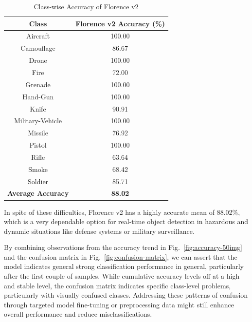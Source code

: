 \documentclass[fleqn,10pt,lineno]{wlpeerj}
\begin{document}
\begin{table}[H]
\centering
\caption{Class-wise Accuracy of Florence v2 }
\renewcommand{\arraystretch}{1.5} %
\setlength{\tabcolsep}{12pt} %
\begin{tabular}{|c|c|}
\hline
\textbf{Class} & \textbf{Florence v2 Accuracy (\%)} \\
\hline
Aircraft           & 100.00 \\
Camouflage         & 86.67  \\
Drone              & 100.00 \\
Fire               & 72.00  \\
Grenade            & 100.00 \\
Hand-Gun           & 100.00 \\
Knife              & 90.91  \\
Military-Vehicle   & 100.00 \\
Missile            & 76.92  \\
Pistol             & 100.00 \\
Rifle              & 63.64  \\
Smoke              & 68.42  \\
Soldier            & 85.71  \\
\hline
\textbf{Average Accuracy} & \textbf{88.02} \\
\hline
\end{tabular}
\label{tab:ddqn_metrics}
\end{table}

In spite of these difficulties, Florence v2 has a highly accurate mean of 88.02\%, which is a very dependable option for real-time object detection in hazardous and dynamic situations like defense systems or military surveillance.

By combining observations from the accuracy trend in Fig.~\ref{fig:accuracy-50img} and the confusion matrix in Fig.~\ref{fig:confusion-matrix}, we can assert that the model indicates general strong classification performance in general, particularly after the first couple of samples. While cumulative accuracy levels off at a high and stable level, the confusion matrix indicates specific class-level problems, particularly with visually confused classes. Addressing these patterns of confusion through targeted model fine-tuning or preprocessing data might still enhance overall performance and reduce misclassifications.
\end{document}

